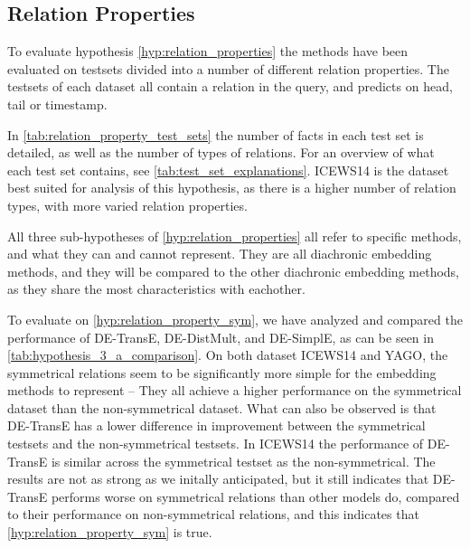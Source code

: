 \subsection{Relation Properties}
\label{sec:relation_properties_experiment}



%
%
%




To evaluate hypothesis \autoref{hyp:relation_properties} the methods have been evaluated on testsets divided into a number of different relation properties. The testsets of each dataset all contain a relation in the query, and predicts on head, tail or timestamp.

In \autoref{tab:relation_property_test_sets} the number of facts in each test set is detailed, as well as the number of types of relations.
For an overview of what each test set contains, see \autoref{tab:test_set_explanations}.
ICEWS14 is the dataset best suited for analysis of this hypothesis, as there is a higher number of relation types, with more varied relation properties.

All three sub-hypotheses of \autoref{hyp:relation_properties} all refer to specific methods, and what they can and cannot represent. They are all diachronic embedding methods, and they will be compared to the other diachronic embedding methods, as they share the most characteristics with eachother.

To evaluate on \autoref{hyp:relation_property_sym}, we have analyzed and compared the performance of DE-TransE, DE-DistMult, and DE-SimplE, as can be seen in \autoref{tab:hypothesis_3_a_comparison}.
On both dataset ICEWS14 and YAGO, the symmetrical relations seem to be significantly more simple for the embedding methods to represent -- They all achieve a higher performance on the symmetrical dataset than the non-symmetrical dataset. What can also be observed is that DE-TransE has a lower difference in improvement between the symmetrical testsets and the non-symmetrical testsets. In ICEWS14 the performance of DE-TransE is similar across the symmetrical testset as the non-symmetrical. The results are not as strong as we initally anticipated, but it still indicates that DE-TransE performs worse on symmetrical relations than other models do, compared to their performance on non-symmetrical relations, and this indicates that \autoref{hyp:relation_property_sym} is true.

